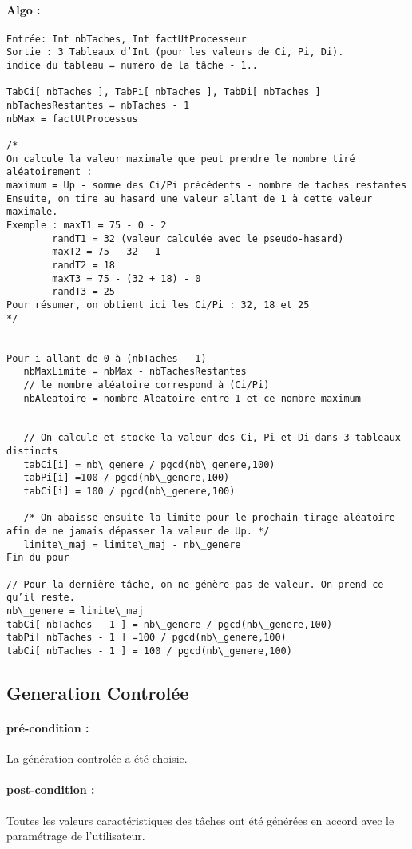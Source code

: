 		\paragraph{Algo :}
			\begin{verbatim}
Entrée: Int nbTaches, Int factUtProcesseur
Sortie : 3 Tableaux d’Int (pour les valeurs de Ci, Pi, Di). 
indice du tableau = numéro de la tâche - 1..

TabCi[ nbTaches ], TabPi[ nbTaches ], TabDi[ nbTaches ]
nbTachesRestantes = nbTaches - 1
nbMax = factUtProcessus 

/*
On calcule la valeur maximale que peut prendre le nombre tiré aléatoirement :
maximum = Up - somme des Ci/Pi précédents - nombre de taches restantes
Ensuite, on tire au hasard une valeur allant de 1 à cette valeur maximale.
Exemple : maxT1 = 75 - 0 - 2
	    randT1 = 32 (valeur calculée avec le pseudo-hasard)
	    maxT2 = 75 - 32 - 1
	    randT2 = 18
	    maxT3 = 75 - (32 + 18) - 0
	    randT3 = 25
Pour résumer, on obtient ici les Ci/Pi : 32, 18 et 25
*/


Pour i allant de 0 à (nbTaches - 1)
   nbMaxLimite = nbMax - nbTachesRestantes
   // le nombre aléatoire correspond à (Ci/Pi)
   nbAleatoire = nombre Aleatoire entre 1 et ce nombre maximum


   // On calcule et stocke la valeur des Ci, Pi et Di dans 3 tableaux distincts
   tabCi[i] = nb\_genere / pgcd(nb\_genere,100)
   tabPi[i] =100 / pgcd(nb\_genere,100)
   tabCi[i] = 100 / pgcd(nb\_genere,100)
	        
   /* On abaisse ensuite la limite pour le prochain tirage aléatoire afin de ne jamais dépasser la valeur de Up. */
   limite\_maj = limite\_maj - nb\_genere
Fin du pour

// Pour la dernière tâche, on ne génère pas de valeur. On prend ce qu’il reste.
nb\_genere = limite\_maj
tabCi[ nbTaches - 1 ] = nb\_genere / pgcd(nb\_genere,100)
tabPi[ nbTaches - 1 ] =100 / pgcd(nb\_genere,100)
tabCi[ nbTaches - 1 ] = 100 / pgcd(nb\_genere,100)
			\end{verbatim}

	\subsection{Generation Controlée}  
		\paragraph{pré-condition :} La génération controlée a été choisie.
		\paragraph{post-condition :} Toutes les valeurs caractéristiques des tâches ont été générées en accord avec le paramétrage de l’utilisateur.
